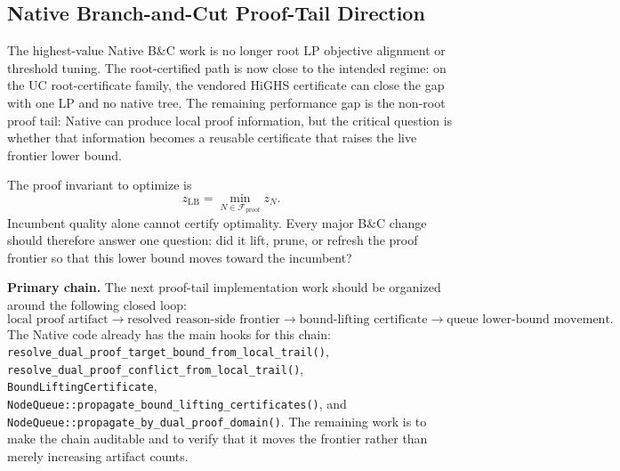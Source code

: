 \subsection{Native Branch-and-Cut Proof-Tail Direction}

The highest-value Native B\&C work is no longer root LP objective alignment or
threshold tuning.  The root-certified path is now close to the intended
regime: on the UC root-certificate family, the vendored HiGHS certificate can
close the gap with one LP and no native tree.  The remaining performance gap is
the non-root proof tail: Native can produce local proof information, but the
critical question is whether that information becomes a reusable certificate
that raises the live frontier lower bound.

The proof invariant to optimize is
\[
  z_{\mathrm{LB}} = \min_{N \in \mathcal{F}_{\mathrm{proof}}} z_N.
\]
Incumbent quality alone cannot certify optimality.  Every major B\&C change
should therefore answer one question: did it lift, prune, or refresh the proof
frontier so that this lower bound moves toward the incumbent?

\textbf{Primary chain.}  The next proof-tail implementation work should be
organized around the following closed loop:
\[
  \text{local proof artifact}
  \rightarrow \text{resolved reason-side frontier}
  \rightarrow \text{bound-lifting certificate}
  \rightarrow \text{queue lower-bound movement}.
\]
The Native code already has the main hooks for this chain:
\texttt{resolve\_dual\_proof\_target\_bound\_from\_local\_trail()},
\texttt{resolve\_dual\_proof\_conflict\_from\_local\_trail()},
\texttt{BoundLiftingCertificate},
\texttt{NodeQueue::propagate\_bound\_lifting\_certificates()}, and
\texttt{NodeQueue::propagate\_by\_dual\_proof\_domain()}.  The remaining work is
to make the chain auditable and to verify that it moves the frontier rather
than merely increasing artifact counts.

